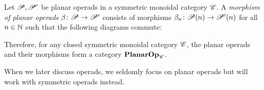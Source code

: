     \begin{defin}
        Let $\P, \P'$ be planar operads in a symmetric monoidal category $\C$. A
        {\em morphism of planar operads} $\beta \colon \P \to \P'$ consists of
        morphisms $\beta_n \colon \P(n) \to \P'(n)$ for all $n \in \N$ such that
        the following diagrams commute:
        \begin{center}
        \end{center}
        \begin{center}
        \end{center}
    \end{defin}
    Therefore, for any closed symmetric monoidal category $\C$, the planar
    operads and their morphisms form a category $\Plop_{\C}$.

    \medskip

    When we later discuss operads, we seldomly focus on planar operads but will
    work with symmetric operads instead.

